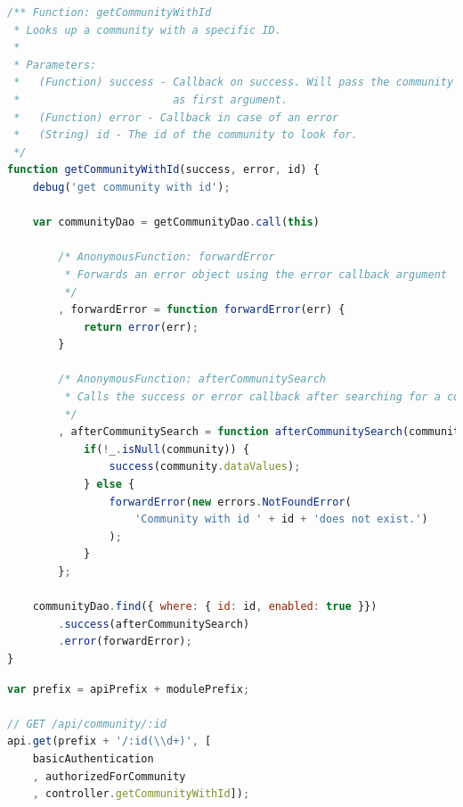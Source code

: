 \begin{lstlisting}[language=JavaScript, caption=API-Controller Beispiel, label=lst:roomiesControllerExample]
/** Function: getCommunityWithId
 * Looks up a community with a specific ID.
 *
 * Parameters:
 *   (Function) success - Callback on success. Will pass the community data
 *                        as first argument.
 *   (Function) error - Callback in case of an error
 *   (String) id - The id of the community to look for.
 */
function getCommunityWithId(success, error, id) {
	debug('get community with id');

	var communityDao = getCommunityDao.call(this)

		/* AnonymousFunction: forwardError
		 * Forwards an error object using the error callback argument
		 */
		, forwardError = function forwardError(err) {
			return error(err);
		}

		/* AnonymousFunction: afterCommunitySearch
		 * Calls the success or error callback after searching for a community.
		 */
		, afterCommunitySearch = function afterCommunitySearch(community) {
			if(!_.isNull(community)) {
				success(community.dataValues);
			} else {
				forwardError(new errors.NotFoundError(
					'Community with id ' + id + 'does not exist.')
				);
			}
		};

	communityDao.find({ where: { id: id, enabled: true }})
		.success(afterCommunitySearch)
		.error(forwardError);
}
\end{lstlisting}

\begin{lstlisting}[language=JavaScript, caption=API-Route Beispiel, label=lst:roomiesComponentExample]
var prefix = apiPrefix + modulePrefix;

// GET /api/community/:id
api.get(prefix + '/:id(\\d+)', [
	basicAuthentication
	, authorizedForCommunity
	, controller.getCommunityWithId]);
\end{lstlisting}
